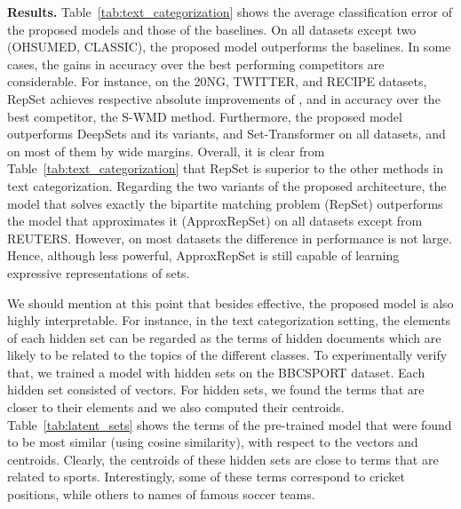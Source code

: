 \documentclass[twoside]{article}
\begin{document}
\noindent\textbf{Results.}
Table~\ref{tab:text_categorization} shows the average classification error of the proposed models and those of the baselines.
On all datasets except two (OHSUMED, CLASSIC), the proposed model outperforms the baselines.
In some cases, the gains in accuracy over the best performing competitors are considerable.
For instance, on the 20NG, TWITTER, and RECIPE datasets, RepSet achieves respective absolute improvements of ,  and  in accuracy over the best competitor, the S-WMD method.
Furthermore, the proposed model outperforms DeepSets and its variants, and Set-Transformer on all datasets, and on most of them by wide margins.
Overall, it is clear from Table~\ref{tab:text_categorization} that RepSet is superior to the other methods in text categorization.
Regarding the two variants of the proposed architecture, the model that solves exactly the bipartite matching problem (RepSet) outperforms the model that approximates it (ApproxRepSet) on all datasets except from REUTERS.
However, on most datasets the difference in performance is not large.
Hence, although less powerful, ApproxRepSet is still capable of learning expressive representations of sets.

We should mention at this point that besides effective, the proposed model is also highly interpretable.
For instance, in the text categorization setting, the elements of each hidden set can be regarded as the terms of hidden documents which are likely to be related to the topics of the different classes.
To experimentally verify that, we trained a model with  hidden sets on the BBCSPORT dataset.
Each hidden set consisted of  vectors.
For  hidden sets, we found the terms that are closer to their elements and we also computed their centroids.
Table~\ref{tab:latent_sets} shows the terms of the pre-trained model that were found to be most similar (using cosine similarity), with respect to the vectors and centroids.
Clearly, the centroids of these  hidden sets are close to terms that are related to sports.
Interestingly, some of these terms correspond to cricket positions, while others to names of famous soccer teams.
\end{document}
